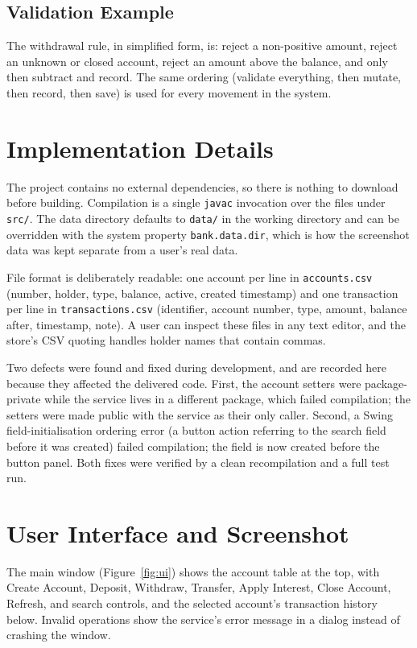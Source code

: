 \documentclass[11pt,a4paper]{report}
\begin{document}
\subsection{Validation Example}
The withdrawal rule, in simplified form, is: reject a non-positive amount, reject an unknown or closed account, reject an amount above the balance, and only then subtract and record. The same ordering (validate everything, then mutate, then record, then save) is used for every movement in the system.

\section{Implementation Details}
The project contains no external dependencies, so there is nothing to download before building. Compilation is a single \texttt{javac} invocation over the files under \texttt{src/}. The data directory defaults to \texttt{data/} in the working directory and can be overridden with the system property \texttt{bank.data.dir}, which is how the screenshot data was kept separate from a user's real data.

File format is deliberately readable: one account per line in \texttt{accounts.csv} (number, holder, type, balance, active, created timestamp) and one transaction per line in \texttt{transactions.csv} (identifier, account number, type, amount, balance after, timestamp, note). A user can inspect these files in any text editor, and the store's CSV quoting handles holder names that contain commas.

Two defects were found and fixed during development, and are recorded here because they affected the delivered code. First, the account setters were package-private while the service lives in a different package, which failed compilation; the setters were made public with the service as their only caller. Second, a Swing field-initialisation ordering error (a button action referring to the search field before it was created) failed compilation; the field is now created before the button panel. Both fixes were verified by a clean recompilation and a full test run.

\section{User Interface and Screenshot}
The main window (Figure~\ref{fig:ui}) shows the account table at the top, with Create Account, Deposit, Withdraw, Transfer, Apply Interest, Close Account, Refresh, and search controls, and the selected account's transaction history below. Invalid operations show the service's error message in a dialog instead of crashing the window.
\end{document}
